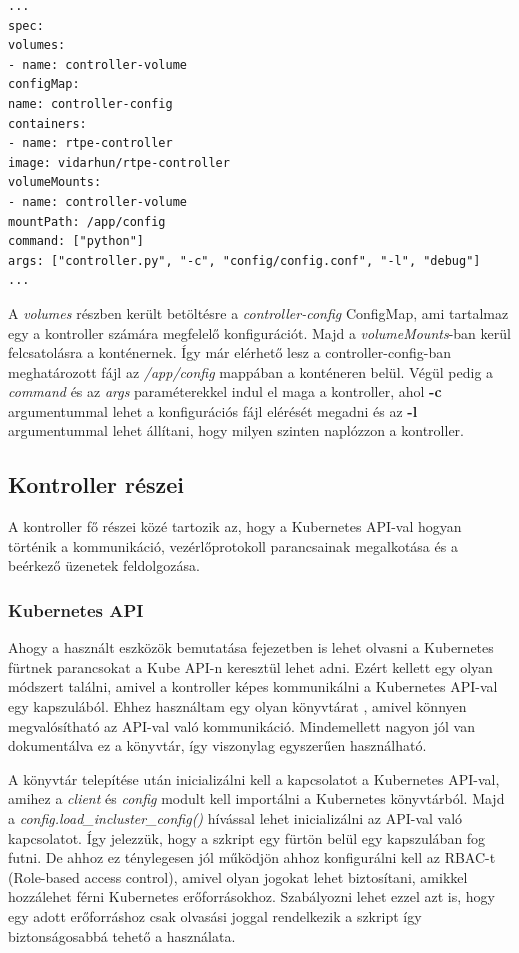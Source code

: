 \begin{lstlisting}[caption=Kubernetes konténer specifikációja, label=lst:kubeSpec]
...
spec:
volumes:
- name: controller-volume
configMap:
name: controller-config
containers:
- name: rtpe-controller
image: vidarhun/rtpe-controller
volumeMounts:
- name: controller-volume
mountPath: /app/config
command: ["python"]
args: ["controller.py", "-c", "config/config.conf", "-l", "debug"]
...
\end{lstlisting}

A \textit{volumes} részben került betöltésre a \textit{controller-config} ConfigMap, ami 
tartalmaz egy a kontroller számára megfelelő konfigurációt. Majd a \textit{volumeMounts}-ban
kerül felcsatolásra a konténernek. Így már elérhető lesz a controller-config-ban meghatározott
fájl az \textit{/app/config} mappában a konténeren belül. Végül pedig a \textit{command} és az
\textit{args} paraméterekkel indul el maga a kontroller, ahol \textbf{-c} argumentummal 
lehet a konfigurációs fájl elérését megadni és az \textbf{-l} argumentummal lehet állítani,
hogy milyen szinten naplózzon a kontroller.

\subsection{Kontroller részei}

A kontroller fő részei közé tartozik az, hogy a Kubernetes API-val 
hogyan történik a kommunikáció, vezérlőprotokoll parancsainak megalkotása és
a beérkező üzenetek feldolgozása. 

\subsubsection{Kubernetes API}

Ahogy a használt eszközök bemutatása fejezetben is lehet olvasni a Kubernetes
fürtnek parancsokat a Kube API-n keresztül lehet adni. Ezért kellett egy olyan
módszert találni, amivel a kontroller képes kommunikálni a Kubernetes API-val 
egy kapszulából. Ehhez használtam egy olyan könyvtárat \cite{pythonKubeAPI}, amivel
könnyen megvalósítható az API-val való kommunikáció. Mindemellett nagyon jól
van dokumentálva ez a könyvtár, így viszonylag egyszerűen használható.

A könyvtár telepítése után inicializálni kell a kapcsolatot a Kubernetes 
API-val, amihez a \textit{client} és \textit{config} modult kell importálni
a Kubernetes könyvtárból. Majd a \textit{config.load\_incluster\_config()}
hívással lehet inicializálni az API-val való kapcsolatot. Így jelezzük, hogy a
szkript egy fürtön belül egy kapszulában fog futni. De ahhoz ez ténylegesen jól 
működjön ahhoz konfigurálni kell az RBAC-t (Role-based access control), amivel 
olyan jogokat lehet biztosítani, amikkel hozzálehet férni Kubernetes 
erőforrásokhoz. Szabályozni lehet ezzel azt is, hogy egy adott erőforráshoz 
csak olvasási joggal rendelkezik a szkript így biztonságosabbá tehető a használata.

